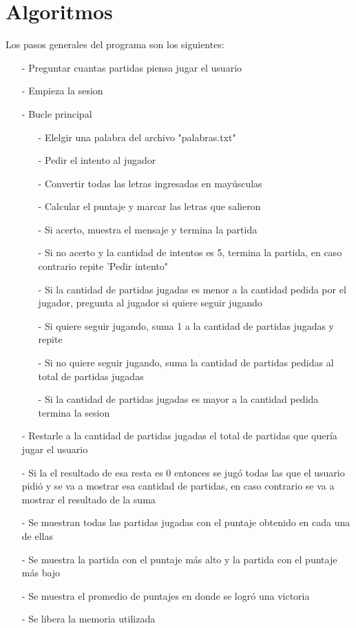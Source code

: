\documentclass[oneside]{article}
\begin{document}
	\newpage
	\thispagestyle{fancy}	
	
	\section*{Algoritmos}
	Los pasos generales del programa	son los siguientes:
	\begin{itemize}
	\item[-]Preguntar cuantas partidas piensa jugar el usuario
	\item[-]Empieza la sesion
	\item[-]Bucle principal		
		\begin{itemize}
		\item[-]Elelgir una palabra del archivo "palabras.txt"	
		\item[-]Pedir el intento al jugador
		\item[-]Convertir todas las letras ingresadas en mayúsculas
		\item[-]Calcular el puntaje y marcar las letras que salieron
		\item[-]Si acerto, muestra el mensaje y termina la partida
		\item[-]Si no acerto y la cantidad de intentos es 5, termina la partida, en caso contrario repite 'Pedir intento"
		\item[-]Si la cantidad de partidas jugadas es menor a la cantidad pedida por el jugador, pregunta al jugador si quiere seguir jugando
		\item[-]Si quiere seguir jugando, suma 1 a la cantidad de partidas jugadas y repite
		\item[-]Si no quiere seguir jugando, suma la cantidad de partidas pedidas al total de partidas jugadas
		\item[-]Si la cantidad de partidas jugadas es mayor a la cantidad pedida termina la sesion
		\end{itemize}
	\item[-]Restarle a la cantidad de partidas jugadas el total de partidas que quería jugar el usuario
	\item[-]Si la el resultado de esa resta es 0 entonces se jugó todas las que el usuario pidió y se va a mostrar esa cantidad de partidas, en caso contrario se va a mostrar el resultado de la suma
	\item[-]Se muestran todas las partidas jugadas con el puntaje obtenido en cada una de ellas
	\item[-]Se muestra la partida con el puntaje más alto y la partida con el puntaje más bajo
	\item[-]Se muestra el promedio de puntajes en donde se logró una victoria
	\item[-]Se libera la memoria utilizada	
	\end{itemize}
	
\end{document}

